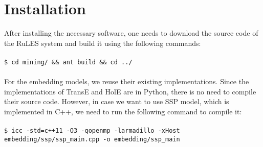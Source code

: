 \section{Installation}
After installing the necessary software, one needs to download the source code of the RuLES system and build it using the following commands:\\
\\
\texttt{\$ cd mining/ \&\& ant build \&\& cd ../}\\
\\
For the embedding models, we reuse their existing implementations. Since the implementations of TransE and HolE are in Python, there is no need to compile their source code. However, in case we want to use SSP model, which is implemented in C++, we need to run the following command to compile it:\\
\\
\texttt{\$ icc -std=c++11 -O3 -qopenmp -larmadillo -xHost embedding/ssp/ssp\_main.cpp -o embedding/ssp\_main}
